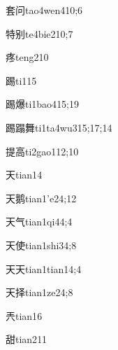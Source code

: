 \begin{verbete}{套问}{tao4wen4}{10;6}
\end{verbete}
\begin{verbete}{特别}{te4bie2}{10;7}
\end{verbete}
\begin{verbete}{疼}{teng2}{10}
\end{verbete}
\begin{verbete}{踢}{ti1}{15}
\end{verbete}
\begin{verbete}{踢爆}{ti1bao4}{15;19}
\end{verbete}
\begin{verbete}{踢蹋舞}{ti1ta4wu3}{15;17;14}
\end{verbete}
\begin{verbete}{提高}{ti2gao1}{12;10}
\end{verbete}
\begin{verbete}{天}{tian1}{4}
\end{verbete}
\begin{verbete}{天鹅}{tian1'e2}{4;12}
\end{verbete}
\begin{verbete}{天气}{tian1qi4}{4;4}
\end{verbete}
\begin{verbete}{天使}{tian1shi3}{4;8}
\end{verbete}
\begin{verbete}{天天}{tian1tian1}{4;4}
\end{verbete}
\begin{verbete}{天择}{tian1ze2}{4;8}
\end{verbete}
\begin{verbete}{兲}{tian1}{6}
\end{verbete}
\begin{verbete}{甜}{tian2}{11}
\end{verbete}
